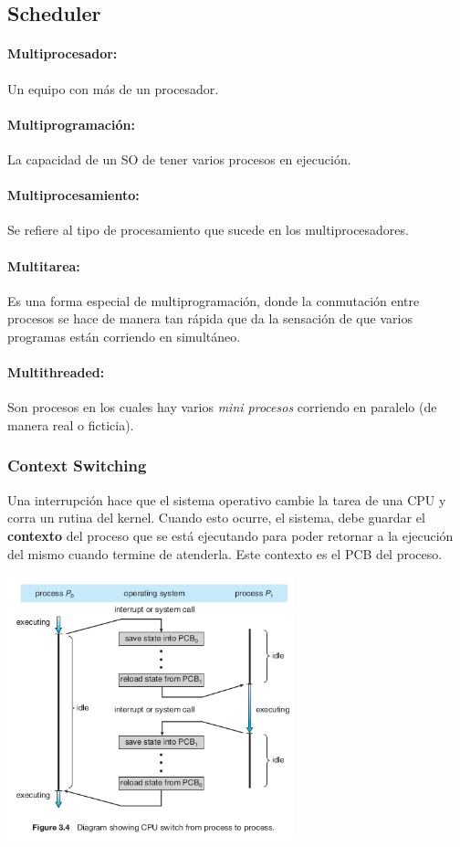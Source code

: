 \subsection{Scheduler}
\paragraph{Multiprocesador:} Un equipo con más de un procesador.
\paragraph{Multiprogramación:} La capacidad de un SO de tener varios procesos en ejecución.
\paragraph{Multiprocesamiento:} Se refiere al tipo de procesamiento que sucede en los multiprocesadores.
\paragraph{Multitarea:} Es una forma especial de multiprogramación, donde la conmutación entre procesos se hace de manera tan rápida que da la sensación de que varios programas están corriendo en simultáneo.
\paragraph{Multithreaded:} Son procesos en los cuales hay varios \textit{mini procesos} corriendo en paralelo (de manera real o ficticia).

\subsubsection{Context Switching}
Una interrupción hace que el sistema operativo cambie la tarea de una CPU y corra un rutina del kernel. Cuando esto ocurre, el sistema, debe guardar el \textbf{contexto} del proceso que se está ejecutando para poder retornar a la ejecución del mismo cuando termine de atenderla. Este contexto es el PCB del proceso.

\vspace*{0.5cm}
\begin{center}
	\includegraphics[width=0.625\textwidth]{imagenes/context-switch.png}

\end{center}

